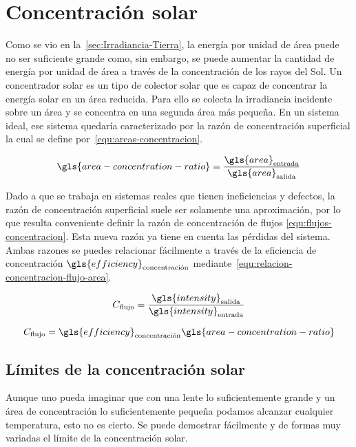 \section{Concentración solar}

	Como se vio en la~\cref{sec:Irradiancia-Tierra}, la energía por unidad de área puede no ser suficiente grande como, sin embargo, se puede aumentar la cantidad de energía por unidad de área a través de la concentración de los rayos del Sol. Un concentrador solar es un tipo de colector solar que es capaz de concentrar la energía solar en un área reducida. Para ello se colecta la irradiancia incidente sobre un área y se concentra en una segunda área más pequeña. En un sistema ideal, ese sistema quedaría caracterizado por la razón de concentración superficial la cual se define por~\eqref{equ:areas-concentracion}.
	
	\begin{equation}\label{equ:areas-concentracion}
		\gls{area-concentration-ratio} = \dfrac{\gls{area}_{\text{entrada}}}{\gls{area}_{\text{salida}}}
	\end{equation}
	
	Dado a que se trabaja en sistemas reales que tienen ineficiencias y defectos, la razón de concentración superficial suele ser solamente una aproximación, por lo que resulta conveniente definir la razón de concentración de flujos \eqref{equ:flujos-concentracion}. Esta nueva razón ya tiene en cuenta las pérdidas del sistema. Ambas razones se puedes relacionar fácilmente a través de la eficiencia de concentración $\gls{efficiency}_{\text{concentración}}$ mediante~\eqref{equ:relacion-concentracion-flujo-area}.
	
	\begin{equation}\label{equ:flujos-concentracion}
		C_{\text{flujo}} = \dfrac{\gls{intensity}_{\text{salida}}}{\gls{intensity}_{\text{entrada}}}
	\end{equation}
	
	\begin{equation}\label{equ:relacion-concentracion-flujo-area}
		C_{\text{flujo}} = \gls{efficiency}_{\text{concentración}} \gls{area-concentration-ratio}
	\end{equation}
	
	\subsection{Límites de la concentración solar}
		
		Aunque uno pueda imaginar que con una lente lo suficientemente grande y un área de concentración lo suficientemente pequeña podamos alcanzar cualquier temperatura, esto no es cierto. Se puede demostrar fácilmente y de formas muy variadas el límite de la concentración solar.
		
